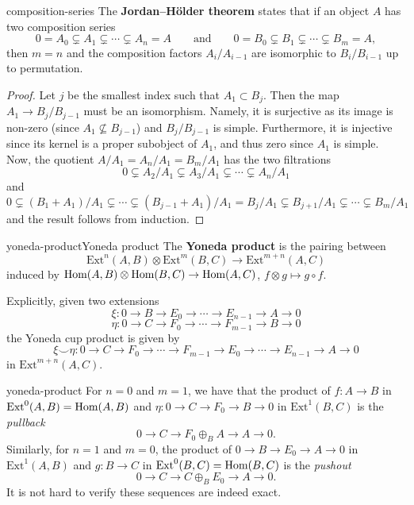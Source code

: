 \begin{example}{composition-series}
    The \textbf{Jordan--Hölder theorem} states that if an object $A$ has two composition series
    \[ 0 = A_0 \subsetneq A_1 \subsetneq \cdots \subsetneq A_n = A \qquad \text{and} \qquad 0 = B_0 \subsetneq B_1 \subsetneq \cdots \subsetneq B_m = A , \]
    then $m = n$ and the composition factors $A_i/A_{i - 1}$ are isomorphic to $B_i/B_{i - 1}$ up to permutation.
    \begin{proof}
        Let $j$ be the smallest index such that $A_1 \subset B_j$. Then the map $A_1 \to B_j/B_{j - 1}$ must be an isomorphism. Namely, it is surjective as its image is non-zero (since $A_1 \nsubseteq B_{j - 1}$) and $B_j/B_{j - 1}$ is simple. Furthermore, it is injective since its kernel is a proper subobject of $A_1$, and thus zero since $A_1$ is simple. Now, the quotient $A/A_1 = A_n/A_1 = B_m/A_1$ has the two filtrations
        \[ 0 \subsetneq A_2/A_1 \subsetneq A_3/A_1 \subsetneq \cdots \subsetneq A_n/A_1 \]
        and
        \[ 0 \subsetneq (B_1 + A_1)/A_1 \subsetneq \cdots \subsetneq (B_{j - 1} + A_1)/A_1 = B_j/A_1 \subsetneq B_{j + 1}/A_1 \subsetneq \cdots \subsetneq B_m/A_1 \]
        and the result follows from induction.    
    \end{proof}
\end{example}

\begin{topic}{yoneda-product}{Yoneda product}
    The \textbf{Yoneda product} is the pairing between 
    \[ \text{Ext}^n(A, B) \otimes \text{Ext}^m(B, C) \to \text{Ext}^{m + n}(A, C) \]
    induced by $\text{Hom}(A, B) \otimes \text{Hom}(B, C) \to \text{Hom}(A, C)$, $f \otimes g \mapsto g \circ f$.
    
    Explicitly, given two extensions
    \[ \xi : 0 \to B \to E_0 \to \cdots \to E_{n - 1} \to A \to 0 \]
    \[ \eta : 0 \to C \to F_0 \to \cdots \to F_{m - 1} \to B \to 0 \]
    the Yoneda cup product is given by
    \[ \xi \smile \eta : 0 \to C \to F_0 \to \cdots \to F_{m - 1} \to E_0 \to \cdots \to E_{n - 1} \to A \to 0 \]
    in $\text{Ext}^{m + n}(A, C)$.
\end{topic}

\begin{example}{yoneda-product}
    For $n = 0$ and $m = 1$, we have that the product of $f : A \to B$ in $\text{Ext}^0(A, B) = \text{Hom}(A, B)$ and $\eta : 0 \to C \to F_0 \to B \to 0$ in $\text{Ext}^1(B, C)$ is the \textit{pullback}
    \[ 0 \to C \to F_0 \oplus_B A \to A \to 0 . \]
    Similarly, for $n = 1$ and $m = 0$, the product of $0 \to B \to E_0 \to A \to 0$ in $\text{Ext}^1(A, B)$ and $g : B \to C$ in $\text{Ext}^0(B, C) = \text{Hom}(B, C)$ is the \textit{pushout}
    \[ 0 \to C \to C \oplus_B E_0 \to A \to 0 . \]
    It is not hard to verify these sequences are indeed exact. 
\end{example}

